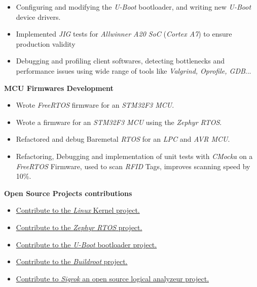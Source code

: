 \begin{cventries}
{\begin{cvitems}
\begin{itemize}
            \item{Configuring and modifying the \textit{U-Boot} bootloader, and writing new \textit{U-Boot} device drivers.}
          \item{Implemented \textit{JIG} tests for \textit{Allwinner A20 SoC} (\textit{Cortex A7}) to ensure production validity} 
          \item{Debugging and profiling client softwares, detecting bottlenecks and performance issues using wide range of tools like \textit{Valgrind, Oprofile, GDB}...}
        \end{itemize}
      \item{\textbf{MCU Firmwares Development}}
        \begin{itemize}
          \item{Wrote \textit{FreeRTOS} firmware for an \textit{STM32F3 MCU}.}
          \item{Wrote a firmware for an \textit{STM32F3 MCU} using the \textit{Zephyr RTOS}.}
          \item{Refactored and debug Baremetal \textit{RTOS} for an \textit{LPC} and \textit{AVR MCU}.}
          \item{Refactoring, Debugging and implementation of unit tests with \textit{CMocka} on a \textit{FreeRTOS} Firmware, used to scan \textit{RFID} Tags, improves scanning speed by 10\%.}
        \end{itemize}
      \item{\textbf{Open Source Projects contributions}}
        \begin{itemize}
          \item{\href{https://patchwork.kernel.org/project/linux-arm-kernel/list/?submitter=92211&archive=both}{Contribute to the \textit{Linux} Kernel project. \faExternalLink}}
          \item{\href{https://github.com/zephyrproject-rtos/zephyr/commits?author=sbourdelin}{Contribute to the \textit{Zephyr RTOS} project. \faExternalLink}}
          \item{\href{http://u-boot.10912.n7.nabble.com/template/NamlServlet.jtp?macro=user_nodes&user=8888}{Contribute to the \textit{U-Boot} bootloader project. \faExternalLink}}
          \item{\href{http://buildroot-busybox.2317881.n4.nabble.com/template/NamlServlet.jtp?macro=user_nodes&user=1269}{Contribute to the \textit{Buildroot} project. \faExternalLink}}
          \item{\href{https://www.sigrok.org/blog/new-protocol-decoder-pwm}{Contribute to \textit{Sigrok} an open source logical analyzeur project. \faExternalLink}}
        \end{itemize}
      \end{cvitems}
    }


\end{cventries}
